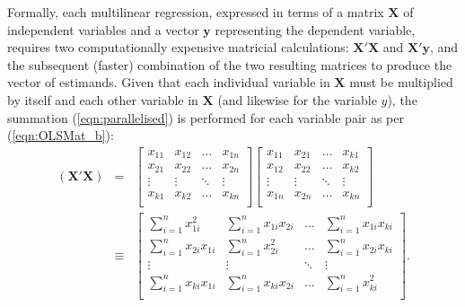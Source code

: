 \documentclass{article}[11pt,subeqn]
\newcommand{\vect}[1]{\mathbf{#1}}
\begin{document}
\begin{spacing}{1.25}
Formally, each multilinear regression, expressed in terms of a matrix $\vect{X}$ of independent variables and a vector $\vect{y}$ representing the 
dependent variable, requires two computationally expensive matricial calculations: $\vect{X'X}$ and $\vect{X'y}$, and the subsequent (faster) combination
of the two resulting matrices to produce the vector of estimands. Given that each individual variable in $\vect{X}$ must be multiplied by itself and
each other variable in $\vect{X}$ (and likewise for the variable $y$), the summation (\ref{eqn:parallelised}) is performed for each variable pair as
per (\ref{eqn:OLSMat_b}):
\begin{subequations}
\begin{eqnarray}
\label{eqn:OLSMat}
\vect{(X'X)}&=& %
\begin{bmatrix}
x_{11} &  x_{12} & \ldots & x_{1n}\\
x_{21} &  x_{22} & \ldots & x_{2n}\\
\vdots & \vdots  & \ddots &  \vdots\\
x_{k1} &  x_{k2} & \ldots & x_{kn}\\
\end{bmatrix}%
\begin{bmatrix}
x_{11} &  x_{21} & \ldots & x_{k1}\\
x_{12} &  x_{22} & \ldots & x_{k2}\\
\vdots & \vdots  & \ddots &  \vdots\\
x_{1n} &  x_{2n} & \ldots & x_{kn}\\
\end{bmatrix}\\ \label{eqn:OLSMat_a}
&\equiv&
\begin{bmatrix}
\sum^n_{i=1}x^2_{1i} &  \sum^n_{i=1}x_{1i}x_{2i} & \ldots & \sum^n_{i=1}x_{1i}x_{ki}\\
\sum^n_{i=1}x_{2i}x_{1i} &  \sum^n_{i=1}x^2_{2i} & \ldots & \sum^n_{i=1}x_{2i}x_{ki}\\
\vdots & \vdots  & \ddots &  \vdots\\
\sum^n_{i=1}x_{ki}x_{1i} &  \sum^n_{i=1}x_{ki}x_{2i} & \ldots & \sum^n_{i=1}x^2_{ki}\\
\end{bmatrix}. \label{eqn:OLSMat_b}
\end{eqnarray}
\end{subequations}

\nocite{vespignani2011modelling}
\newpage


\end{spacing}
\end{document}
